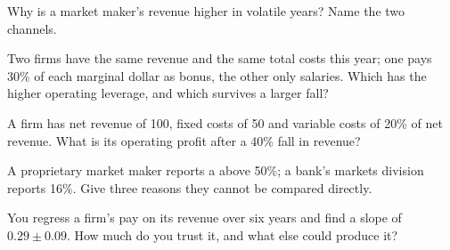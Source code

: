 \begin{interviewq}\label{iq:fm:the-economics-of-a-trading-firm:2}
Why is a market maker's revenue higher in volatile years? Name the two channels.
\end{interviewq}

\begin{interviewq}\label{iq:fm:the-economics-of-a-trading-firm:3}
Two firms have the same revenue and the same total costs this year; one pays 30\% of each marginal dollar as bonus, the other only salaries. Which
has the higher operating leverage, and which survives a larger fall?
\end{interviewq}

\begin{interviewq}\label{iq:fm:the-economics-of-a-trading-firm:4}
A firm has net revenue of 100, fixed costs of 50 and variable costs of 20\% of net revenue. What is its operating profit after a 40\% fall in
revenue?
\end{interviewq}

\begin{interviewq}\label{iq:fm:the-economics-of-a-trading-firm:5}
A proprietary market maker reports a  above 50\%; a bank's markets division reports 16\%. Give three reasons they cannot be
compared directly.
\end{interviewq}

\begin{interviewq}\label{iq:fm:the-economics-of-a-trading-firm:6}
You regress a firm's pay on its revenue over six years and find a slope of $0.29\pm0.09$. How much do you trust it, and what else could produce it?
\end{interviewq}
